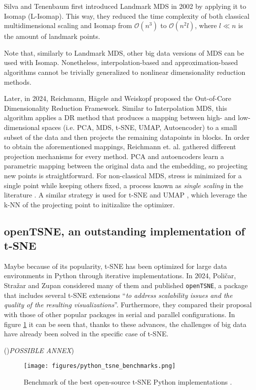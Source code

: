 Silva and Tenenbaum \cite{deSilvaTenenbaum2002} first introduced Landmark MDS in 2002 by applying it to Isomap (L-Isomap). This way, they reduced the time complexity of both classical multidimensional scaling and Isomap from $\mathcal{O}(n^3)$ to $\mathcal{O}(n^2l)$, where $l \ll n$ is the amount of landmark points.

Note that, similarly to Landmark MDS, other big data versions of MDS can be used with Isomap. Nonetheless, interpolation-based and approximation-based algorithms cannot be trivially generalized to nonlinear dimensionality reduction methods.

Later, in 2024, Reichmann, Hägele and Weiskopf \cite{reichmann2024outofcoredimensionalityreductionlarge} proposed the Out-of-Core Dimensionality Reduction Framework. Similar to Interpolation MDS, this algorithm applies a DR method that produces a mapping between high- and low-dimensional spaces (i.e. PCA, MDS, t-SNE, UMAP, Autoencoder) to a small subset of the data and then projects the remaining datapoints in blocks. In order to obtain the aforementioned mappings, Reichmann et. al. gathered different projection mechanisms for every method. PCA and autoencoders learn a parametric mapping between the original data and the embedding, so projecting new points is straightforward. For non-classical MDS, stress is minimized for a single point while keeping others fixed, a process known as \textit{single scaling} in the literature \cite{single-scaling}. A similar strategy is used for t-SNE \cite{tsne-knn} and UMAP \cite{McInnes2018}, which leverage the k-NN of the projecting point to initizalize the optimizer.

\subsection{openTSNE, an outstanding implementation of t-SNE}

Maybe because of its popularity, t-SNE has been optimized for large data environments in Python through iterative implementations. In 2024, Poličar, Stražar and Zupan \cite{Policar2024} considered many of them and published \verb|openTSNE|, a package that includes several t-SNE extensions \enquote{\textit{to address scalability issues and the quality of the resulting visualizations}}. Furthermore, they compared their proposal with those of other popular packages in serial and parallel configurations. In figure \ref{fig:python_tsne_benchmarks} it can be seen that, thanks to these advances, the challenges of big data have already been solved in the specific case of t-SNE.

()\textit{POSSIBLE ANNEX})

\begin{figure}[ht]
    \centering
    \texttt{[image: figures/python\_tsne\_benchmarks.png]}
    \caption{Benchmark of the best open-source t-SNE Python implementations \cite{Policar2024}.}
    \label{fig:python_tsne_benchmarks}
\end{figure}